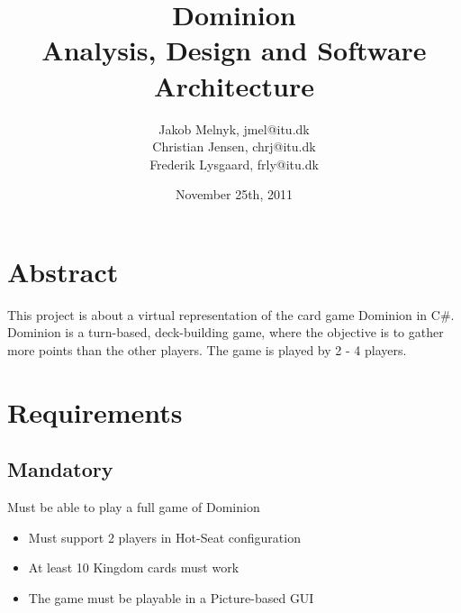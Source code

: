 \documentclass[12pt,a4paper,notitlepage]{article}
\title{\huge{Dominion}\\
\large{Analysis, Design and Software Architecture}
}
\author{
Jakob Melnyk, jmel@itu.dk\\
Christian Jensen, chrj@itu.dk\\
Frederik Lysgaard, frly@itu.dk
}
\date{November 25th, 2011}
\begin{document}
\maketitle
\vfill
\section*{Abstract}
This project is about a virtual representation of the card game Dominion in C\#. Dominion is a turn-based, deck-building game, where the objective is to gather more points than the other players. The game is played by 2 - 4 players.
\clearpage
\tableofcontents
\pagebreak
\section{Requirements}
\subsection{Mandatory}
Must be able to play a full game of Dominion
\begin{itemize}
\item Must support 2 players in Hot-Seat configuration
\item At least 10 Kingdom cards must work
\item The game must be playable in a Picture-based GUI
\end{itemize}
\end{document}
